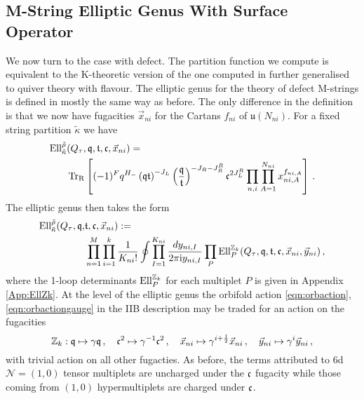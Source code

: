 \documentclass[main.tex]{subfiles}
\begin{document}
\subsection{M-String Elliptic Genus With Surface Operator}
We now turn to the case with defect. The partition function we compute is equivalent to the K-theoretic version of the one computed in \cite{Kanno:2011fw} further generalised to quiver theory with flavour. The elliptic genus for the theory of defect M-strings is defined in mostly the same way as before. The only difference in the definition is that we now have fugacities $\vec{x}_{ni}$ for the Cartans $f_{ni}$ of $\mathfrak{u}\left(N_{ni}\right)$. For a fixed string partition $\tilde{\kappa}$ we have
\begin{equation}\label{eqn:indexdefect}
\begin{aligned}
\textrm{Ell}^{\tilde{\rho}}_{\tilde{\kappa}}&(Q_{\tau},\mathfrak{q},\mathfrak{t},\mathfrak{c},\vec{x}_{ni})=\\
&\operatorname{Tr}_{\text{R}}\left[(-1)^Fq^{H_-}\left(\mathfrak{q}\mathfrak{t}\right)^{-J_L}\left(\frac{\mathfrak{q}}{\mathfrak{t}}\right)^{-J_R-J_R^R}\mathfrak{c}^{2J_L^R}\prod_{n,i}\prod_{A=1}^{N_{ni}}x_{ni,A}^{f_{ni,A}}\right]\,.
\end{aligned}
\end{equation}
The elliptic genus then takes the form
\begin{equation}\label{eqn:contourdefect}
\begin{aligned}
\textrm{Ell}^{\tilde{\rho}}_{\tilde{\kappa}}(Q_{\tau},\mathfrak{q},&\mathfrak{t},\mathfrak{c},\vec{x}_{ni}):=\\
&\prod_{n=1}^M\prod_{i=1}^k\frac{1}{K_{ni}!}\oint\prod_{I=1}^{K_{ni}}\frac{dy_{ni,I}}{2\pi\mathrm{i} y_{ni,I}}\prod_{P}\textrm{Ell}^{\mathbb{Z}_k}_{P}(Q_{\tau},\mathfrak{q},\mathfrak{t},\mathfrak{c},\vec{x}_{ni},\vec{y}_{ni})\,,
\end{aligned}
\end{equation}
where the 1-loop determinants $\textrm{Ell}_{P}^{\mathbb{Z}_k}$ for each multiplet $P$ is given in Appendix \ref{App:EllZk}. At the level of the elliptic genus the orbifold action \eqref{eqn:orbaction}, \eqref{eqn:orbactiongauge} in the IIB description may be traded for an action on the fugacities
\begin{equation}\label{eqn:orbfugacity}
\mathbb{Z}_k:\mathfrak{q}\mapsto \gamma\mathfrak{q}\,,\quad \mathfrak{c}^2\mapsto \gamma^{-1}\mathfrak{c}^2\,,\quad \vec{x}_{ni}\mapsto \gamma^{i+\frac{1}{2}}\vec{x}_{ni}\,,\quad \vec{y}_{ni}\mapsto \gamma^i\vec{y}_{ni}\,,
\end{equation}
with trivial action on all other fugacties.
As before, the terms attributed to 6d $\mathcal{N}=(1,0)$ tensor multiplets are uncharged under the $\mathfrak{c}$ fugacity while those coming from $(1,0)$ hypermultiplets are charged under $\mathfrak{c}$.
\end{document}
